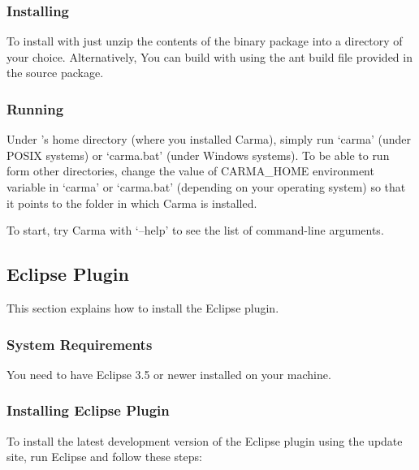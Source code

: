 \documentclass{article}
\begin{document}
\subsubsection{Installing \Carma}

To install \CoreASM with \Carma just unzip the contents of the binary package into a 
directory of your choice. Alternatively, You can build \CoreASM with \Carma using the 
ant build file provided in the source package.

\subsubsection{Running \Carma}

Under \Carma's home directory (where you installed Carma), 
simply run `carma' (under POSIX systems) or `carma.bat' (under Windows systems). 
To be able to run \Carma form other directories, change the value of {\ttfamily CARMA\_HOME} environment 
variable in `carma' or `carma.bat' (depending on your operating system) so that it points to the folder 
in which Carma is installed.

To start, try Carma with `{\ttfamily --help}' to see the list of command-line arguments. 

\subsection{\CoreASM Eclipse Plugin}

This section explains how to install the \CoreASM Eclipse plugin.

\subsubsection{System Requirements}

You need to have Eclipse 3.5 or newer installed on your machine.

\subsubsection{Installing \CoreASM Eclipse Plugin}

To install the latest development version of the \CoreASM Eclipse plugin using the update site, 
run Eclipse and follow these steps:

\newcommand{\menulink}{$\rightarrow$}
\newcommand{\menunav}[1]{{\sl #1}}
\end{document}
